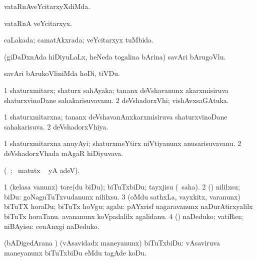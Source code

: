 \bentry
{}
\gl{\kirxvi}
\bmng
vataRnAveYcitarxyXdiMda. 
\emng
\eentry

\bentry
{}
\gl{\nA}
\bmng
vataRnA veYcitarxyx. 
\emng
\eentry

\bentry
{}
\gl{\gu}
\bmng
caLakada; camatAkxrada; veYcitarxyx tuMbida. 
\emng
\eentry

\bentry
{}
\gl{\nA}
\bmng
(giDaDxnAda hiDiyuLaLx, heNeda togalina bArina) savAri bArugoVlu. 
\emng
\eentry

\bentry
{}
\gl{\sakirx}
\bmng
savAri bArukoVliniMda hoDi, tiVDu. 
\emng
\eentry

\bentry
{}
\gl{\nA}
\bmng
\bnum
\num{1} shaturxmitarx; shaturx sahAyaka; tananx deVshavanunx akarxmisiruva shaturx\-vinoDane sahakarisuvavanu. 
\num{2} deVshadorxVhi; vishAvxsaGAtuka. 
\enum
\emng
\eentry

\bentry
{}
\gl{\gu}
\bmng
\bnum
\num{1} shaturxmitarxna; tananx deVshavanAnxkarxmisiruva shaturxvinoDane sahakarisuva. 
\num{2} deVshadorxVhiya. 
\enum
\emng
\eentry

\bentry
{}
\gl{\nA}
\expl{}
\bmng
\bnum
\num{1} shaturxmitarxna anuyAyi; shaturxmeYtirx niVtiyanunx anusarisuvavanu. 
\num{2} deVshadorxVhada mAgaR hiDiyuvava. 
\enum
\emng
\eentry

\bentry
{}
\gl{\kirx}
\bmng
(\vakaq\ ; \BU\ matutx \BUkaq\  yA adeV).
\emng

\noindent
\gl{\sakirx}
\bmng
\bnum
\num{1} (kelasa \mo vanunx) tore(du biDu); biTuTxbiDu; tayxjisu (\akirx\ saha). 
\num{2} (\ame) nililxsu; biDu:  goNaguTuTxvudanunx nililxsu. 
\num{3} (oMdu sathxLa, vayxkitx, \mo varanunx) biTuTX horaDu; biTuTx hoVgu; agalu:  pAYxrisf nagaravanunx naDurAtirxyalilx biTuTx horaTanu.  avananunx koVpadalilx agalidanu. 
\num{4} (\AtAmx) naDeduko; vatiRsu; niBAyisu:  cenAnxgi naDeduko. 
\enum
\emng

\noindent
\gl{\akirx}
\bmng
(bADigedArana \vi) (vAsavidadx maneyanunx) biTuTxbiDu:   vAsaviruva maneyanunx biTuTxbiDu eMdu tagAde koDu. 
\emng

